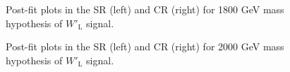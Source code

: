 \begin{figure}[H]
  \centering
  \caption{Post-fit plots in the SR (left) and CR (right) for 1800 GeV mass hypothesis of $W'_{\text{L}}$ signal.}
  \label{fig:Postfit_WpLH1800_Asimov}
\end{figure}
\begin{figure}[H]
  \centering
  \caption{Post-fit plots in the SR (left) and CR (right) for 2000 GeV mass hypothesis of $W'_{\text{L}}$ signal.}
  \label{fig:Postfit_WpLH2000_Asimov}
\end{figure}
